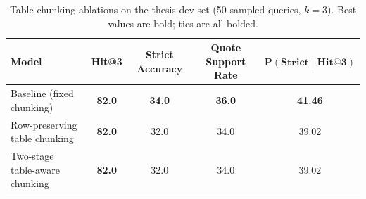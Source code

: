 \begin{table}[t]
\centering
\small
\setlength{\tabcolsep}{6pt}
\caption{Table chunking ablations on the thesis dev set (50 sampled queries, $k=3$). Best values are bold; ties are all bolded.}
\label{tab:table_chunking_ablation_rag_style}
\begin{tabular}{lcccc}
\toprule
\textbf{Model} &
\textbf{Hit@3} &
\textbf{Strict Accuracy} &
\textbf{Quote Support Rate} &
$\mathbf{P(\text{Strict} \mid \text{Hit@3})}$ \\
\midrule
Baseline (fixed chunking)                & \textbf{82.0} & \textbf{34.0} & \textbf{36.0} & \textbf{41.46} \\
Row-preserving table chunking            & \textbf{82.0} & 32.0          & 34.0          & 39.02          \\
Two-stage table-aware chunking           & \textbf{82.0} & 32.0          & 34.0          & 39.02          \\
\bottomrule
\end{tabular}
\end{table}

